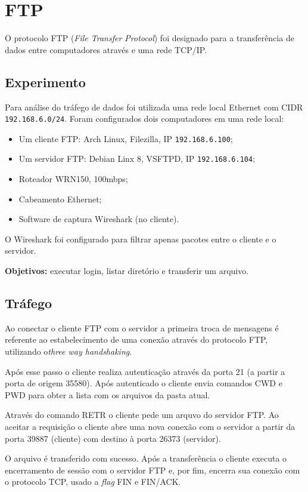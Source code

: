 \chapter{FTP}

O protocolo FTP (\textit{File Transfer Protocol}) foi designado para a transferência de dados entre computadores através e uma rede TCP/IP.

\section{Experimento}
Para análise do tráfego de dados foi utilizada uma rede local Ethernet com CIDR \texttt{192.168.6.0/24}. Foram configurados dois computadores em uma rede local:

\begin{itemize}
	\item Um cliente FTP: Arch Linux, Filezilla, IP \texttt{192.168.6.100};
	\item Um servidor FTP: Debian Linx 8, VSFTPD, IP \texttt{192.168.6.104};
	\item Roteador WRN150, 100mbps;
	\item Cabeamento Ethernet;
	\item Software de captura Wireshark (no cliente).
\end{itemize}

O Wireshark foi configurado para filtrar apenas pacotes entre o cliente e o servidor.

\textbf{Objetivos:} executar login, listar diretório e transferir um arquivo.

\section{Tráfego}
Ao conectar o cliente FTP com o servidor a primeira troca de mensagens é referente ao estabelecimento de uma conexão através do protocolo FTP, utilizando o\textit{three way handshaking}.

Após esse passo o cliente realiza autenticação através da porta 21 (a partir a porta de origem 35580). Após autenticado o cliente envia comandos CWD e PWD  para obter a lista com os arquivos da pasta atual.

Através do comando RETR o cliente pede um arquvo do servidor FTP. Ao aceitar a requisição o cliente abre uma nova conexão com o servidor a partir da porta 39887 (cliente) com destino à porta 26373 (servidor).

O arquivo é transferido com sucesso. Após a transferência o cliente executa o encerramento de sessão com o servidor FTP e, por fim, encerra sua conexão com o protocolo TCP, usado a \textit{flag} FIN e FIN/ACK.

